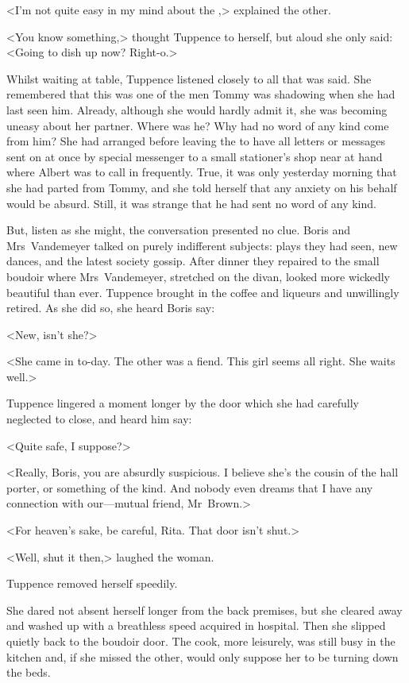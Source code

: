 <I'm not quite easy in my mind about the ,> explained the other.

<You know something,> thought Tuppence to herself, but aloud she only said: <Going to dish up now? Right-o.>

Whilst waiting at table, Tuppence listened closely to all that was said. She remembered that this was one of the men Tommy was shadowing when she had last seen him. Already, although she would hardly admit it, she was becoming uneasy about her partner. Where was he? Why had no word of any kind come from him? She had arranged before leaving the  to have all letters or messages sent on at once by special messenger to a small stationer's shop near at hand where Albert was to call in frequently. True, it was only yesterday morning that she had parted from Tommy, and she told herself that any anxiety on his behalf would be absurd. Still, it was strange that he had sent no word of any kind.

But, listen as she might, the conversation presented no clue. Boris and Mrs~Vandemeyer talked on purely indifferent subjects: plays they had seen, new dances, and the latest society gossip. After dinner they repaired to the small boudoir where Mrs~Vandemeyer, stretched on the divan, looked more wickedly beautiful than ever. Tuppence brought in the coffee and liqueurs and unwillingly retired. As she did so, she heard Boris say:

<New, isn't she?>

<She came in to-day. The other was a fiend. This girl seems all right. She waits well.>

Tuppence lingered a moment longer by the door which she had carefully neglected to close, and heard him say:

<Quite safe, I suppose?>

<Really, Boris, you are absurdly suspicious. I believe she's the cousin of the hall porter, or something of the kind. And nobody even dreams that I have any connection with our—mutual friend, Mr~Brown.>

<For heaven's sake, be careful, Rita. That door isn't shut.>

<Well, shut it then,> laughed the woman.

Tuppence removed herself speedily.

She dared not absent herself longer from the back premises, but she cleared away and washed up with a breathless speed acquired in hospital. Then she slipped quietly back to the boudoir door. The cook, more leisurely, was still busy in the kitchen and, if she missed the other, would only suppose her to be turning down the beds.

